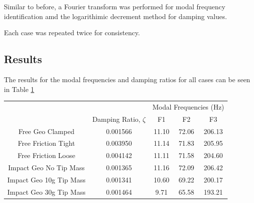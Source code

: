 \documentclass[11pt]{article}
\begin{document}
Similar to before, a Fourier transform was performed for modal frequency identification amd the logarithimic decrement method for damping values.

Each case was repeated twice for consistency.


\subsection{Results}

The results for the modal frequencies and damping ratios for all cases can be seen in Table \ref{tab:1res}
\begin{table}[H]
\label{tab:1res}
\centering
\begin{tabular}{|c|c|c|c|c|}
\hline
\rowcolor[HTML]{CBCEFB} 
\cellcolor[HTML]{CBCEFB}                       & \cellcolor[HTML]{CBCEFB}                                         & \multicolumn{3}{c|}{\cellcolor[HTML]{CBCEFB}Modal Frequencies (Hz)} \\ \cline{3-5} 
\rowcolor[HTML]{CBCEFB} 
\multirow{-2}{*}{\cellcolor[HTML]{CBCEFB}Case} & \multirow{-2}{*}{\cellcolor[HTML]{CBCEFB}Damping Ratio, $\zeta$} & F1                   & F2                   & F3                    \\ \hline
Free Geo Clamped                               & 0.001566                                                         & 11.10                & 72.06                & 206.13                \\ \hline
Free Friction Tight                            & 0.003950                                                         & 11.14                & 71.83                & 205.95                \\ \hline
Free Friction Loose                            & 0.004142                                                         & 11.11                & 71.58                & 204.60                \\ \hline
Impact Geo No Tip Mass                         & 0.001365
                                                       & 11.16                & 72.09                & 206.42                \\ \hline
Impact Geo 10g Tip Mass                        & 0.001341                                                         & 10.60                & 69.22                & 200.17                \\ \hline
Impact Geo 30g Tip Mass                        & 0.001464                                                         & 9.71                 & 65.58                & 193.21                \\ \hline
\end{tabular}
\end{table}
\end{document}
